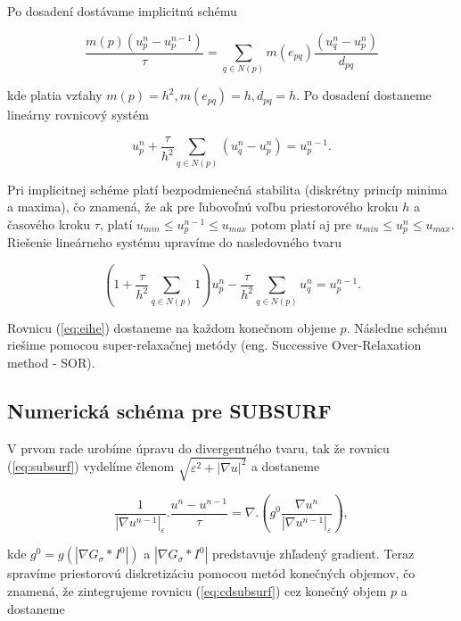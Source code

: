 \documentclass[a4paper,11pt,oneside]{article}%
\def\epsilon{\varepsilon}
\begin{document}
Po dosadení dostávame implicitnú schému  

\begin{equation}
\frac{m(p)(u_p^n -u_p^{n - 1})}{\tau} = \sum_{q \in N(p)} m(e_{pq})\frac{(u_q^n - u_p^n)}{d_{pq}}
\end{equation}

kde platia vzťahy $m(p) = h^2, m(e_{pq}) = h, d_{pq} = h$. Po dosadení dostaneme lineárny rovnicový systém

\begin{equation}
u_p^n + \frac{\tau}{h^2}\sum_{q \in N(p)} (u_q^n - u_p^n) = u_p^{n - 1}.
\end{equation}

Pri implicitnej schéme platí bezpodmienečná stabilita (diskrétny princíp minima a maxima), čo znamená, že ak pre ľubovoľnú voľbu priestorového kroku $h$ a časového kroku $\tau$, platí $u_{min} \leq u_p^{n - 1} \leq u_{max}$ potom platí aj pre $u_{min} \leq u_p^{n} \leq u_{max}$. Riešenie lineárneho systému upravíme do nasledovného tvaru

\begin{equation} \label{eq:eihe}
(1 + \frac{\tau}{h^2} \sum_{q \in N(p)}1)u_p^n - \frac{\tau}{h^2} \sum_{q \in N(p)}u_q^n = u_p^{n - 1}.
\end{equation}

Rovnicu (\ref{eq:eihe}) dostaneme na každom konečnom objeme $p$. Následne schému riešime pomocou super-relaxačnej metódy (eng. Successive Over-Relaxation method - SOR). 

\subsection{Numerická schéma pre SUBSURF}

V prvom rade urobíme úpravu do divergentného tvaru, tak že rovnicu (\ref{eq:subsurf}) vydelíme členom $\sqrt{\epsilon^2 + |\nabla u|^2}$ a dostaneme

\begin{equation} \label{eq:cdsubsurf}
\frac{1}{|\nabla u^{n-1}|_{\epsilon}}.\frac{u^n-u^{n-1}}{\tau} = \nabla.(g^0\frac{\nabla u^n}{|\nabla u^{n-1}|_{\epsilon}}),
\end{equation}

kde $g^0 = g(|\nabla G_{\sigma}*I^0|)$ a $|\nabla G_{\sigma}*I^0|$ predstavuje zhľadený gradient. Teraz spravíme priestorovú diskretizáciu pomocou metód konečných objemov, čo znamená, že zintegrujeme rovnicu (\ref{eq:cdsubsurf}) cez konečný objem $p$ a dostaneme
\end{document}
